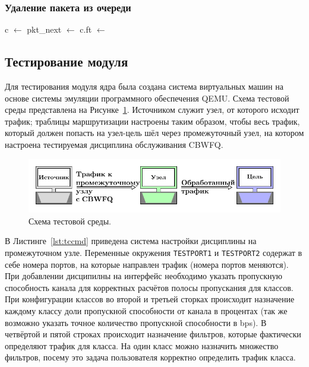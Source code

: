 		\subsubsection{Удаление пакета из очереди}

			\begin{algorithmic}
					\State c $\gets$ 
					\State pkt\_next $\gets$ 
					\State c.ft $\gets$ 
					\State \Return {}
				\EndFunction
			\end{algorithmic}

	\subsection{Тестирование модуля}

		Для тестирования модуля ядра была создана система виртуальных машин на основе
		системы эмуляции программного обеспечения QEMU. Схема тестовой среды представлена
		на Рисунке~\ref{pic:testscheme}. Источником служит узел, от которого исходит трафик;
		траблицы маршрутизации настроены таким образом, чтобы весь трафик, который
		должен попасть на узел-цель шёл через промежуточный узел, на котором
		настроена тестируемая дисциплина обслуживания CBWFQ.

        \begin{figure}[ht!]
        	\center
        	\includegraphics[scale=1.2]{pdfimages/test_scheme.pdf}
        	\caption{Схема тестовой среды.}
			\label{pic:testscheme}
        \end{figure}

		В Листинге~\ref{lst:tccmd} приведена система настройки дисциплины на промежуточном узле.
		Переменные окружения \lstinline{TESTPORT1} и \lstinline{TESTPORT2} содержат в себе
		номера портов, на которые направлен трафик (номера портов меняются). При добавлении
		дисципилны на интерфейс необходимо указать пропускную способность канала для
		корректных расчётов полосы пропускания для классов. При конфигурации классов
		во второй и третьей сторках происходит назначение каждому классу доли
		пропускной способности от канала в процентах (так же возможно указать точное
		количество пропускной способности в bps). В четвёртой и пятой строках
		происходит назначение фильтров, которые фактически определяют трафик
		для класса. На один класс можно назначить множество фильтров, посему
		это задача пользователя корректно определить трафик класса. 

